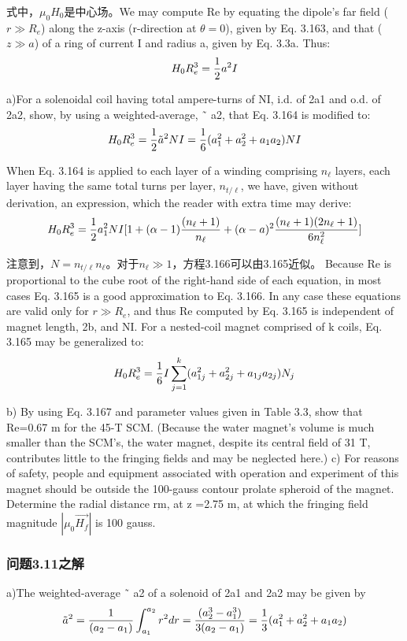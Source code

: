 式中，$\mu_0 H_0$是中心场。We may compute Re by equating the dipole’s far
field ($r\gg R_e$) along the z-axis (r-direction at $\theta=0$), given by Eq. 3.163, and that
($z\gg a$) of a ring of current I and radius a, given by Eq. 3.3a. Thus:
$$
H_{0}R_{e}^{3}=\frac{1}{2}a^{2}I\\%
$$

a)For a solenoidal coil having total ampere-turns of NI, i.d. of 2a1 and o.d. of
2a2, show, by using a weighted-average, ˜ a2, that Eq. 3.164 is modified to:
$$
H_{0}R_{e}^{3}=\frac{1}{2}\tilde{a}^{2}NI=\frac{1}{6}(a_{1}^{2}+a_{2}^{2}+a_{1}a_{2})NI\\%
$$

When Eq. 3.164 is applied to each layer of a winding comprising $n_{\ell}$ layers, each
layer having the same total turns per layer, $n_{t/\ell}$, we have, given without derivation,
an expression, which the reader with extra time may derive:
$$
H_{0}R_{e}^{3}=\frac{1}{2}a_{1}^{2}NI[1+(\alpha-1)\frac{(n_{\ell}+1)}{n_{\ell}}+(\alpha-a)^{2}\frac{(n_{\ell}+1)(2n_{\ell}+1)}{6n_{\ell}^{2}}]\\%
$$

注意到，$N=n_{t/\ell} n_{\ell}$。对于$n_{\ell}\gg1$，方程3.166可以由3.165近似。
Because Re is proportional to the cube root of the right-hand side of each equation, in most cases Eq. 3.165 is a good approximation to Eq. 3.166. In any case
these equations are valid only for $r\gg R_e$, and thus Re computed by Eq. 3.165 is
independent of magnet length, 2b, and NI. For a nested-coil magnet comprised
of k coils, Eq. 3.165 may be generalized to:
$$
H_{0}R_{e}^{3}=\frac{1}{6}I\sum_{j=1}^{k}(a_{1j}^{2}+a_{2j}^{2}+a_{1j}a_{2j})N_{j}\\%
$$

b) By using Eq. 3.167 and parameter values given in Table 3.3, show that
Re=0.67 m for the 45-T SCM. (Because the water magnet’s volume is much
smaller than the SCM’s, the water magnet, despite its central field of 31 T,
contributes little to the fringing fields and may be neglected here.)
c) For reasons of safety, people and equipment associated with operation and
experiment of this magnet should be outside the 100-gauss contour prolate
spheroid of the magnet. Determine the radial distance rm, at z =2.75 m, at
which the fringing field magnitude $|\mu_0 \vec{H_f}|$ is 100 gauss.

\subsubsection{问题3.11之解}
a)The weighted-average ˜ a2 of a solenoid of 2a1 and 2a2 may be given by
$$
\tilde{a}^{2}=\frac{1}{(a_{2}-a_{1})}\int_{a_{1}}^{a_{2}}r^{2}dr=\frac{(a_{2}^{3}-a_{1}^{3})}{3(a_{2}-a_{1})}=\frac{1}{3}(a_{1}^{2}+a_{2}^{2}+a_{1}a_{2})\\%
$$

